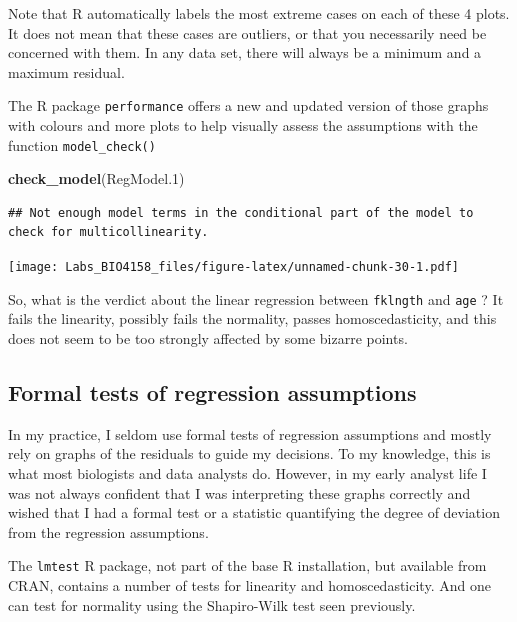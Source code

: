 \documentclass[
  12pt,
]{book}
\makeatletter
\newenvironment{Shaded}{\begin{snugshade}}{\end{snugshade}}
\newcommand{\FloatTok}[1]{\textcolor[rgb]{0.00,0.00,0.81}{#1}}
\newcommand{\KeywordTok}[1]{\textcolor[rgb]{0.13,0.29,0.53}{\textbf{#1}}}
\newcommand{\NormalTok}[1]{#1}
\newenvironment{kframe}{%
\medskip{}
\setlength{\fboxsep}{.8em}
\def\at@end@of@kframe{}%
\ifinner\ifhmode%
 \def\at@end@of@kframe{\end{minipage}}%
 \begin{minipage}{\columnwidth}%
\fi\fi%
\def\FrameCommand##1{\hskip\@totalleftmargin \hskip-\fboxsep
\colorbox{incolor}{##1}\hskip-\fboxsep
    \hskip-\linewidth \hskip-\@totalleftmargin \hskip\columnwidth}%
\MakeFramed {\advance\hsize-\width
  \@totalleftmargin\z@ \linewidth\hsize
  \@setminipage}}%
{\par\unskip\endMakeFramed%
\at@end@of@kframe}
\newenvironment{rmdblock}[1]
 {
 \begin{itemize}
 \renewcommand{\labelitemi}{
   \raisebox{-.7\height}[0pt][0pt]{
     {\setkeys{Gin}{width=3em,keepaspectratio}\texttt{[image: images/\#1]}}
   }
 }
 \begin{kframe}
 \setlength{\fboxsep}{1em}
 \item
 }
 {
 \end{kframe}
 \end{itemize}
 }
\newenvironment{rmdwarning}
  {\begin{rmdblock}{warning}}
  {\end{rmdblock}}
\makeatother
\begin{document}
\begin{rmdwarning}
Note that R automatically labels the most extreme cases on each of these 4 plots. It does not mean that these cases are outliers, or that you necessarily need be concerned with them. In any data set, there will always be a minimum and a maximum residual.
\end{rmdwarning}

The R package \texttt{performance} offers a new and updated version of those graphs with colours and more plots to help visually assess the assumptions with the function \texttt{model\_check()}

\begin{Shaded}
\begin{Highlighting}[]
\KeywordTok{check\_model}\NormalTok{(RegModel}\FloatTok{.1}\NormalTok{)}
\end{Highlighting}
\end{Shaded}

\begin{verbatim}
## Not enough model terms in the conditional part of the model to check for multicollinearity.
\end{verbatim}

\texttt{[image: Labs\_BIO4158\_files/figure-latex/unnamed-chunk-30-1.pdf]}

So, what is the verdict about the linear regression between \texttt{fklngth} and \texttt{age} ? It fails the linearity, possibly fails the normality, passes homoscedasticity, and this does not seem to be too strongly affected by some bizarre points.

\hypertarget{formal-tests-of-regression-assumptions}{%
\subsection{Formal tests of regression assumptions}\label{formal-tests-of-regression-assumptions}}

In my practice, I seldom use formal tests of regression assumptions and mostly rely on graphs of the residuals to guide my decisions. To my knowledge, this is what most biologists and data analysts do. However, in my early analyst life I was not always confident that I was interpreting these graphs correctly and wished that I had a formal test or a statistic quantifying the degree of deviation from the regression assumptions.

The \texttt{lmtest} R package, not part of the base R installation, but available from CRAN, contains a number of tests for linearity and homoscedasticity. And one can test for normality using the Shapiro-Wilk test seen previously.
\end{document}
